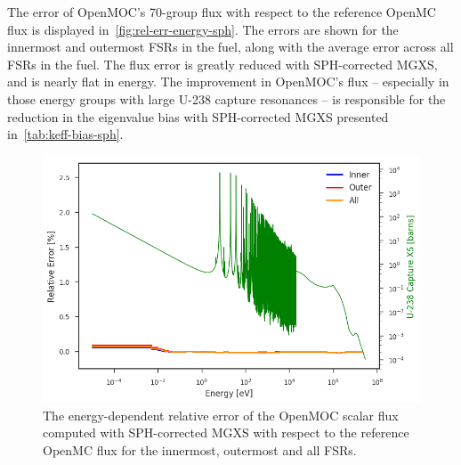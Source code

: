 
The error of OpenMOC's 70-group flux with respect to the reference OpenMC flux is displayed in~\autoref{fig:rel-err-energy-sph}. The errors are shown for the innermost and outermost FSRs in the fuel, along with the average error across all FSRs in the fuel. The flux error is greatly reduced with SPH-corrected MGXS, and is nearly flat in energy. The improvement in OpenMOC's flux -- especially in those energy groups with large U-238 capture resonances -- is responsible for the reduction in the eigenvalue bias with SPH-corrected MGXS presented in~\autoref{tab:keff-bias-sph}.

\begin{figure}[h!]
\centering
\includegraphics[width=\linewidth]{figures/rel-err-inner-outer-sph}
\caption{The energy-dependent relative error of the OpenMOC scalar flux computed with SPH-corrected MGXS with respect to the reference OpenMC flux for the innermost, outermost and all FSRs.}
\label{fig:rel-err-energy-sph}
\end{figure}

